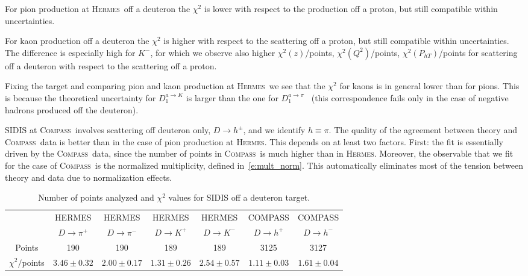 \documentclass[aps,preprintnumbers,showpacs,nofootinbib,superscriptaddress,floatfix]{revtex4}
\newcommand{\AS}[1]{{\textcolor[rgb]{1,0,1}{#1}}}
\newcommand{\hermes}{\textsc{Hermes}}
\newcommand{\compass}{\textsc{Compass}}
\begin{document}
For pion production at \hermes\ off a deuteron the $\chi^2$ is lower with respect to the production off a proton, but still compatible within uncertainties. 

\AS{For kaon production off a deuteron the $\chi^2$ is higher with respect to the scattering off a proton, but still compatible within uncertainties. 
The difference is especially high for $K^-$, for which we observe also higher $\chi^2(z)$/points,  $\chi^2(Q^2)$/points, $\chi^2(P_{hT})$/points for scattering off a deuteron with respect to the scattering off a proton.}

Fixing the target and comparing pion and kaon production at \hermes\, we see that the $\chi^2$ for kaons is in general lower than for pions. This is because the theoretical uncertainty for $D_1^{a \to K}$ is larger than the one for $D_1^{a \to \pi}$~\cite{Epele:2012vg,Signori:2013mda} \AS{(this correspondence fails only in the case of negative hadrons produced off the deuteron)}.

SIDIS at \compass\ involves scattering off deuteron only, $D \to h^\pm$, and we identify $h \equiv \pi$. 
The quality of the agreement between theory and \compass\ data is better than in the case of pion production at \hermes. This depends on at least two factors. First: the fit is essentially driven by the \compass\ data, since the number of points in \compass\ is much higher than in \hermes. Moreover, the observable that we fit for the case of \compass\ is the normalized multiplicity, defined in~\eqref{e:mult_norm}. This automatically eliminates \AS{most of the} tension between theory and data due to normalization effects.
\begin{table}[h!]
\begin{center}
\begin{tabular}{|c|c|c|c|c|c|c|}
 \hline
\hline
  & HERMES & HERMES & HERMES & HERMES & COMPASS & COMPASS\\
 ~          &  $D \to \pi^+$    &   $D \to \pi^-$    &  $D \to K^+$    &   $D \to K^-$      &  $D \to h^+$    &   $D \to h^-$            \\
\hline
 Points         &  190 & 190 & 189 & 189   & 3125 & 3127   \\
 \hline
$\chi^2 /$points & $3.46\pm 0.32$ & $2.00\pm 0.17$ & $1.31\pm 0.26$ & $2.54\pm 0.57$  & $1.11\pm 0.03$ & $1.61\pm 0.04$ \\            
 \hline
 \hline
\end{tabular}
\caption{Number of points analyzed and $\chi^2$ values for SIDIS off a deuteron target.} 
\label{t:fl_ind_chi2_eD}
\end{center}
\end{table}
\end{document}
